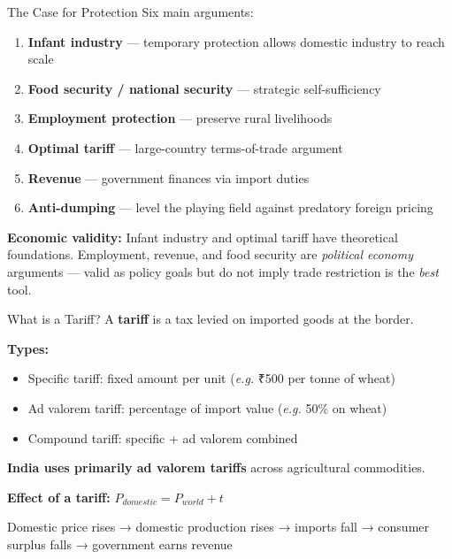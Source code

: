 \documentclass[
  ignorenonframetext,
  aspectratio=169,
]{beamer}
\makeatletter
\providecommand{\tightlist}{%
  \setlength{\itemsep}{0pt}\setlength{\parskip}{0pt}}
\let\quarto@originallabel\label
\DeclareRobustCommand*{\label}[1]{\quarto@originallabel{#1}}
\makeatother
\begin{document}
\begin{frame}{The Case for Protection}
\label{the-case-for-protection}
Six main arguments:

\begin{enumerate}
\tightlist
\item
  \textbf{Infant industry} --- temporary protection allows domestic
  industry to reach scale
\item
  \textbf{Food security / national security} --- strategic
  self-sufficiency
\item
  \textbf{Employment protection} --- preserve rural livelihoods
\item
  \textbf{Optimal tariff} --- large-country terms-of-trade argument
\item
  \textbf{Revenue} --- government finances via import duties
\item
  \textbf{Anti-dumping} --- level the playing field against predatory
  foreign pricing
\end{enumerate}

\textbf{Economic validity:} Infant industry and optimal tariff have
theoretical foundations. Employment, revenue, and food security are
\emph{political economy} arguments --- valid as policy goals but do not
imply trade restriction is the \emph{best} tool.
\end{frame}

\begin{frame}{What is a Tariff?}
\label{what-is-a-tariff}
A \textbf{tariff} is a tax levied on imported goods at the border.

\textbf{Types:}

\begin{itemize}
\tightlist
\item
  {Specific tariff}: fixed amount per unit (\emph{e.g.} ₹500 per tonne
  of wheat)
\item
  {Ad valorem tariff}: percentage of import value (\emph{e.g.} 50\% on
  wheat)
\item
  {Compound tariff}: specific + ad valorem combined
\end{itemize}

\textbf{India uses primarily ad valorem tariffs} across agricultural
commodities.

\textbf{Effect of a tariff:} \(P_{domestic} = P_{world} + t\)

Domestic price rises → domestic production rises → imports fall →
consumer surplus falls → government earns revenue
\end{frame}
\end{document}
